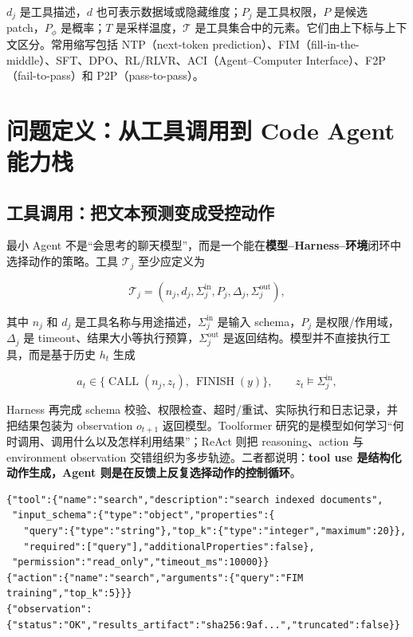 \documentclass[10pt,a4paper,UTF8,fontset=none]{ctexart}
\begin{document}
\begin{keybox}[重载符号与缩写]
\hspace{0.3em}$d_j$ 是工具描述，$d$ 也可表示数据域或隐藏维度；$P_j$ 是工具权限，$P$ 是候选 patch，$P_\phi$ 是概率；$T$ 是采样温度，$\mathcal{T}$ 是工具集合中的元素。它们由上下标与上下文区分。常用缩写包括 NTP（next-token prediction）、FIM（fill-in-the-middle）、SFT、DPO、RL/RLVR、ACI（Agent--Computer Interface）、F2P（fail-to-pass）和 P2P（pass-to-pass）。
\end{keybox}

\clearpage
\section{问题定义：从工具调用到 Code Agent 能力栈}

\subsection{工具调用：把文本预测变成受控动作}

最小 Agent 不是“会思考的聊天模型”，而是一个能在\textbf{模型--Harness--环境}闭环中选择动作的策略。工具 $\mathcal{T}_j$ 至少应定义为

\begin{equation}
\mathcal{T}_j=(n_j,d_j,\Sigma^{\mathrm{in}}_j,P_j,\Delta_j,\Sigma^{\mathrm{out}}_j),
\label{zh:eq:tool-contract}
\end{equation}

其中 $n_j$ 和 $d_j$ 是工具名称与用途描述，$\Sigma^{\mathrm{in}}_j$ 是输入 schema，$P_j$ 是权限/作用域，$\Delta_j$ 是 timeout、结果大小等执行预算，$\Sigma^{\mathrm{out}}_j$ 是返回结构。模型并不直接执行工具，而是基于历史 $h_t$ 生成

\begin{equation}
a_t\in\{\operatorname{CALL}(n_j,z_t),\ \operatorname{FINISH}(y)\},\qquad z_t\models\Sigma^{\mathrm{in}}_j,
\label{zh:eq:tool-action}
\end{equation}

Harness 再完成 schema 校验、权限检查、超时/重试、实际执行和日志记录，并把结果包装为 observation $o_{t+1}$ 返回模型。Toolformer 研究的是模型如何学习“何时调用、调用什么以及怎样利用结果”\cite{zh:schick2023toolformer}；ReAct 则把 reasoning、action 与 environment observation 交错组织为多步轨迹\cite{zh:yao2023react}。二者都说明：\textbf{tool use 是结构化动作生成，Agent 则是在反馈上反复选择动作的控制循环}。

\begin{lstlisting}[style=codeblock,caption={一个最小搜索工具契约及一次调用}]
{"tool":{"name":"search","description":"search indexed documents",
 "input_schema":{"type":"object","properties":{
   "query":{"type":"string"},"top_k":{"type":"integer","maximum":20}},
   "required":["query"],"additionalProperties":false},
 "permission":"read_only","timeout_ms":10000}}
{"action":{"name":"search","arguments":{"query":"FIM training","top_k":5}}}
{"observation":{"status":"OK","results_artifact":"sha256:9af...","truncated":false}}
\end{lstlisting}
\end{document}
